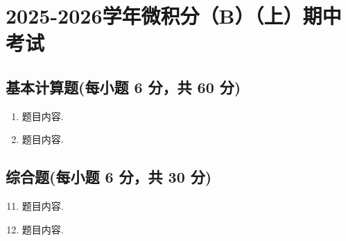 \documentclass[../main.tex]{subfiles}
\begin{document}
%

\newcommand{\ExamYearRange}{2025-2026}
\newcommand{\ExamCourse}{微积分（B）}
\newcommand{\ExamTerm}{（上）}
\newcommand{\ExamType}{期中考试}
\newcommand{\ExamTitle}{\ExamYearRange 学年\ExamCourse\ExamTerm\ExamType}

\newcommand{\qblank}[1]{\vspace{#1}}
\newcommand{\sol}{\textbf{Solution}. }
\newcommand{\prf}{\textbf{Proof}. }

\chapter{\ExamTitle}

\section{基本计算题(每小题 6 分，共 60 分)}
\begin{enumerate}
  \item 题目内容.
    \qblank{10em}

  \item 题目内容.
    \qblank{10em}
\end{enumerate}

\section{综合题(每小题 6 分，共 30 分)}
\begin{enumerate}
  \setcounter{enumi}{10}
  \item 题目内容.
    \qblank{12em}

  \item 题目内容.
    \qblank{12em}
\end{enumerate}
\end{document}
